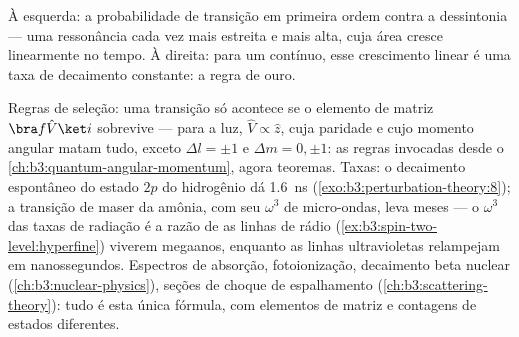 \begin{omfigure}

{\small À esquerda: a probabilidade de transição em primeira ordem
contra a dessintonia --- uma ressonância cada vez mais estreita e mais
alta, cuja área cresce linearmente no tempo. À direita: para um
contínuo, esse crescimento linear é uma taxa de decaimento constante: a
regra de ouro.}
\end{omfigure}

\begin{example}\label{ex:b3:perturbation-theory:applications}
Regras de seleção: uma transição só acontece se o elemento de matriz
$\bra f\hat V\ket i$ sobrevive --- para a luz, $\hat V \propto \hat
z$, cuja paridade e cujo momento angular matam tudo, exceto
$\Delta l = \pm1$ e $\Delta m = 0, \pm1$: as regras invocadas desde o
\cref{ch:b3:quantum-angular-momentum}, agora teoremas. Taxas: o
decaimento espontâneo do estado $2p$ do hidrogênio dá
\qty{1.6}{ns} (\cref{exo:b3:perturbation-theory:8}); a transição de
maser da amônia, com seu $\omega^3$ de micro-ondas, leva meses --- o
$\omega^3$ das taxas de radiação é a razão de as linhas de rádio
(\cref{ex:b3:spin-two-level:hyperfine}) viverem megaanos, enquanto as
linhas ultravioletas relampejam em nanossegundos. Espectros de
absorção, fotoionização, decaimento beta nuclear
(\cref{ch:b3:nuclear-physics}), seções de choque de espalhamento
(\cref{ch:b3:scattering-theory}): tudo é esta única fórmula, com
elementos de matriz e contagens de estados diferentes.
\end{example}

